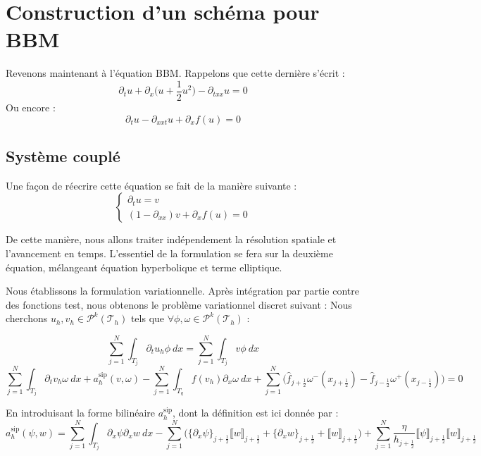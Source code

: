 \section{Construction d'un schéma pour BBM}

Revenons maintenant à l'équation BBM. Rappelons que cette dernière s'écrit :
$$\partial_t u + \partial_x\Big( u + \frac{1}{2}u^2 \Big) - \partial_{txx}u = 0$$
Ou encore :
$$\partial_t u - \partial_{xxt}u + \partial_x f(u) = 0$$


\subsection{Système couplé}

Une façon de réecrire cette équation se fait de la manière suivante :
$$\begin{cases}
    \partial_t u = v\\
    (1 - \partial_{xx})v + \partial_x f(u) = 0
\end{cases}$$

De cette manière, nous allons traiter indépendement la résolution spatiale et l'avancement en temps.
L'essentiel de la formulation se fera sur la deuxième équation, mélangeant équation hyperbolique et terme elliptique.


Nous établissons la formulation variationnelle. Après intégration par partie contre des fonctions test, nous obtenons le problème variationnel discret suivant :
Nous cherchons $u_h,v_h \in \mathcal{P}^k(\mathcal{T}_h)$ tels que $\forall \phi,\omega \in \mathcal{P}^k(\mathcal{T}_h)$ :

\begin{equation}
    \sum_{j=1}^{N} \int_{T_j} \partial_t u_h \phi \ dx = \sum_{j=1}^{N} \int_{T_j} v \phi \ dx \label{formulation1}
\end{equation}
\begin{equation}
    \sum_{j=1}^{N} \int_{T_j} \partial_t v_h \omega \ dx + a_h^{\text{sip}}(v,\omega) - \sum_{j=1}^{N} \int_{T_q} f(v_h) \partial_x \omega \ dx + \sum_{j=1}^{N} \Big( \widehat{f}_{j+\frac{1}{2}}\omega^{-}(x_{j + \frac{1}{2}}) - \widehat{f}_{j - \frac{1}{2}}\omega^+(x_{j - \frac{1}{2}}) \Big) = 0
\end{equation}


En introduisant la forme bilinéaire $a_h^{\text{sip}}$, dont la définition est ici donnée par : 
$$a_h^{\text{sip}}(\psi, w) = \sum_{j=1}^{N} \int_{T_j} \partial_x \psi \partial_x w \ dx - \sum_{j=1}^{N} \Big( \{ \partial_x \psi \}_{j + \frac{1}{2}} \llbracket w \rrbracket_{j + \frac{1}{2}} + \{ \partial_x w \}_{j + \frac{1}{2}} + \llbracket w \rrbracket_{j+\frac{1}{2}}  \Big) + \sum_{j=1}^{N} \frac{\eta}{h_{j + \frac{1}{2}}} \llbracket \psi \rrbracket_{j+\frac{1}{2}} \llbracket w \rrbracket_{j + \frac{1}{2}} $$

